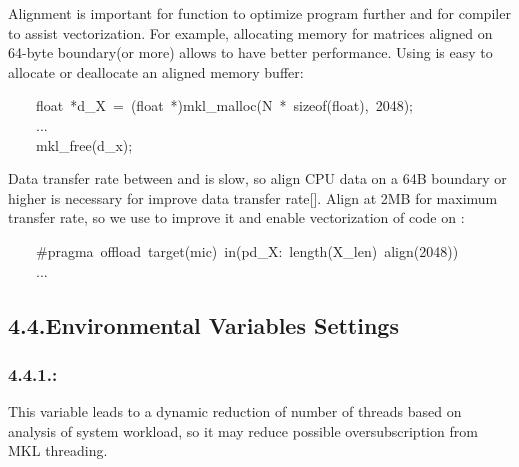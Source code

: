 \documentclass{article}
\begin{document}
\noindent{}Alignment is important for  function to optimize program further and for compiler to assist vectorization. For example, allocating memory for matrices aligned on 64-byte boundary(or more) allows  to have better performance. Using  is easy to allocate or deallocate an aligned memory buffer:%
\begin{mdpre}%
\noindent~~~~{float}~*d\_X~=~({float}~*)mkl\_malloc({N}~*~sizeof({float}),~{2048});\\
~~~~...\\
~~~~mkl\_free(d\_x);%
\end{mdpre}\noindent{}Data transfer rate between  and  is slow, so align CPU data on a 64B boundary or higher is necessary for improve data transfer rate[]. Align at 2MB for maximum transfer rate, so we use  to improve it and enable vectorization of code on :
\begin{mdpre}%
\noindent~~~~\#pragma~offload~target(mic)~in(pd\_X:~length({X\_len})~align({2048}))\\
~~~~...%
\end{mdpre}
\subsection{4.4.\hspace*{0.5em}Environmental Variables Settings}\label{sec-environmental-variables-settings}%

\subsubsection{4.4.1.\hspace*{0.5em}:}\label{sec-mkl_dynamictrue-}%

\noindent{}This variable leads to a dynamic reduction of number of  threads based on analysis of system workload, so it may reduce possible oversubscription from MKL threading.%
\end{document}
